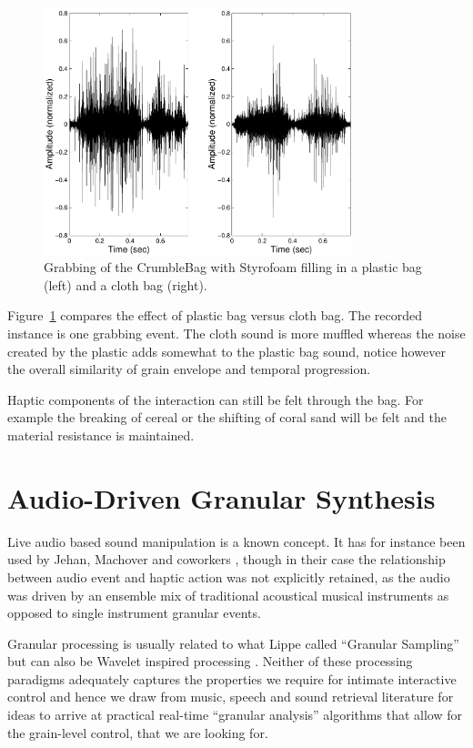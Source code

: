 \begin{figure}[t]
\centering
\includegraphics[width=90mm]{FoamPlot-eps-converted-to.pdf}
\caption{Grabbing of the CrumbleBag with Styrofoam filling in a plastic bag (left) and a cloth bag (right).}
\label{Omodhrain:fig:styrocomp}
\end{figure}

Figure~\ref{Omodhrain:fig:styrocomp} compares the effect of plastic bag versus
cloth bag. The recorded instance is one grabbing event. The cloth
sound is more muffled whereas the noise created by the plastic adds
somewhat to the plastic bag sound, notice however the overall
similarity of grain envelope and temporal progression.

Haptic components of the interaction can still be felt through the bag. For example the
breaking of cereal or the shifting of coral sand will be felt and the
material resistance is maintained.

\section{Audio-Driven Granular Synthesis}

Live audio based sound manipulation is a known
concept. It has for instance been used by Jehan, Machover and
coworkers \cite{Jehan:2001a, Jehan:2002}, though in their case the relationship between audio event and
haptic action was not explicitly retained, as the
audio was driven by an ensemble mix of traditional acoustical musical
instruments as opposed to single instrument granular events.

Granular processing is usually related to what Lippe called ``Granular
Sampling'' \cite{Lippe:1994} but can also be Wavelet inspired processing
\cite[offers a review]{Roads:2001}. Neither of these processing
paradigms adequately captures the properties we require for intimate interactive
control and hence we draw from music, speech and sound retrieval literature
for ideas to arrive at practical real-time ``granular analysis''
algorithms that allow for the grain-level control, that we are looking
for.

